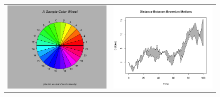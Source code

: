 \begin{figure}[H]
\begin{center}
\begin{tabular}{cc}
\includegraphics[scale=0.25]{ilu/gra1.png} &
\includegraphics[scale=0.25]{ilu/gra2.png} \\

\end{tabular}
\end{center}
\end{figure}
